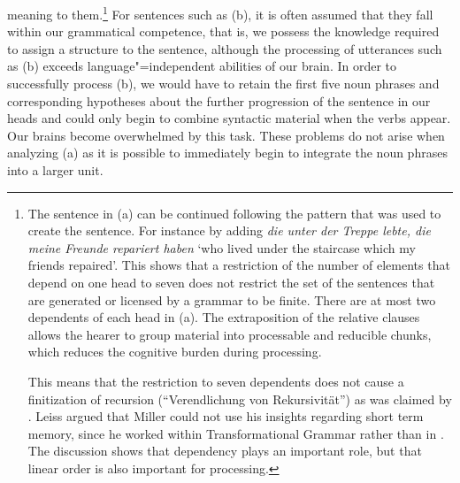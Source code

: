 meaning to them.\footnote{%
  The sentence in (a) can be continued following the pattern that was used to create the
  sentence. For instance by adding \emph{die unter der
    Treppe lebte, die meine Freunde repariert haben} `who lived under the staircase which my
  friends repaired'. This shows that a restriction of the number of elements that depend on one head
to seven  \citep[]{Leiss2003a} does not restrict the set of the sentences that are
generated or licensed by a grammar to be finite. There are at most two dependents of each head in
(a). The extraposition of the relative clauses allows the hearer to group material into
processable and reducible chunks, which reduces the cognitive burden during processing.

  This means that the restriction to seven dependents does not cause a finitization of recursion
  (``Ver\-end\-lichung von Rekursivität'') as was claimed by \citet[]{Leiss2003a}.
  Leiss argued that Miller could not use his insights regarding short term memory, since he worked
  within Transformational Grammar rather than in \dg. The discussion
  shows that dependency plays an important role, but that linear order is also important for processing.
}
For sentences such as (b), it is often assumed that they fall within our grammatical competence, that is, we possess
the knowledge required to assign a structure to the sentence, although the processing of utterances such as (b) exceeds
language"=independent abilities of our brain.
In order to successfully process (b), we would have to retain the first five noun phrases and corresponding hypotheses
about the further progression of the sentence in our heads and could only begin to combine syntactic material when the verbs appear.
Our brains become overwhelmed by this task. These problems do not arise when analyzing (a) as it is possible
to immediately begin to integrate the noun phrases into a larger unit.

